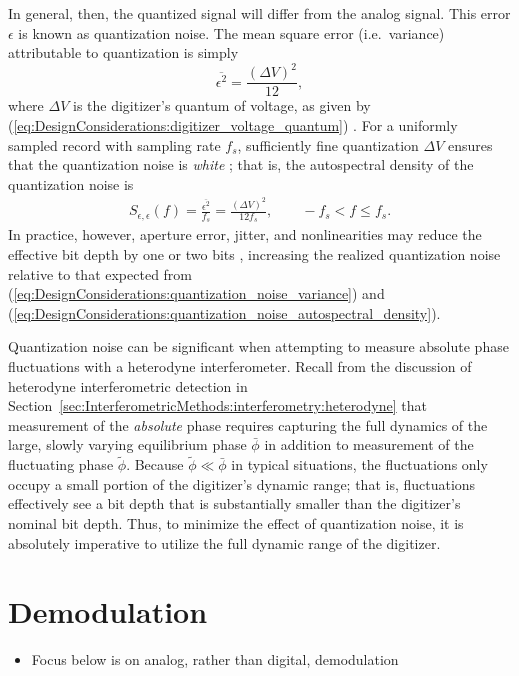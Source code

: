 In general, then, the quantized signal
will differ from the analog signal.
This error $\epsilon$ is known as quantization noise.
The mean square error (i.e.\ variance) attributable to quantization is simply
\begin{equation}
  \overline{\epsilon^2} = \frac{(\Delta V)^2}{12},
  \label{eq:DesignConsiderations:quantization_noise_variance}
\end{equation}
where $\Delta V$ is the digitizer's quantum of voltage,
as given by (\ref{eq:DesignConsiderations:digitizer_voltage_quantum})
\cite{bennett_bstj48}
\cite[Sec.~10.2.4]{bendat_and_piersol}.
For a uniformly sampled record with sampling rate $f_s$,
sufficiently fine quantization $\Delta V$
ensures that the quantization noise is \emph{white}
\cite[Th.~1]{bennett_bstj48}
\cite[Ch.~20]{widrow_and_kollar};
that is, the autospectral density of the quantization noise is
\begin{align}
  S_{\epsilon,\epsilon}(f)
  =
  \frac{\overline{\epsilon^2}}{f_s}
  =
  \frac{(\Delta V)^2}{12 f_s},
  \qquad
  -f_s < f \leq f_s.
  \label{eq:DesignConsiderations:quantization_noise_autospectral_density}
\end{align}
In practice, however, aperture error, jitter, and nonlinearities
may reduce the effective bit depth by one or two bits
\cite[Sec.~10.2.4]{bendat_and_piersol},
increasing the realized quantization noise
relative to that expected from
(\ref{eq:DesignConsiderations:quantization_noise_variance}) and
(\ref{eq:DesignConsiderations:quantization_noise_autospectral_density}).

Quantization noise can be significant
when attempting to measure absolute phase fluctuations
with a heterodyne interferometer.
Recall from the discussion of heterodyne interferometric detection in
Section~\ref{sec:InterferometricMethods:interferometry:heterodyne}
that measurement of the \emph{absolute} phase
requires capturing the full dynamics
of the large, slowly varying equilibrium phase $\bar{\phi}$
in addition to measurement of the fluctuating phase $\tilde{\phi}$.
Because $\tilde{\phi} \ll \bar{\phi}$ in typical situations,
the fluctuations only occupy a small portion
of the digitizer's dynamic range; that is,
fluctuations effectively see a bit depth that
is substantially smaller than the digitizer's nominal bit depth.
Thus, to minimize the effect of quantization noise,
it is absolutely imperative
to utilize the full dynamic range of the digitizer.


\section{Demodulation}
\begin{itemize}
  \item Focus below is on analog, rather than digital, demodulation
\end{itemize}


